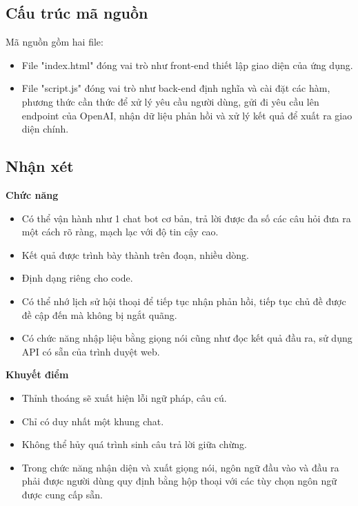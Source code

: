 \documentclass[a4paper, 12pt]{article}
\begin{document}
	
	\subsection{Cấu trúc mã nguồn}
	Mã nguồn gồm hai file: 
	\begin{itemize}
		\item File "index.html" đóng vai trò như front-end thiết lập giao diện của ứng dụng.
		\item File "script.js" đóng vai trò như back-end định nghĩa và cài đặt các hàm, phương thức cần thức để xử lý yêu cầu người dùng, gửi đi yêu cầu lên endpoint của OpenAI, nhận dữ liệu phản hồi và xử lý kết quả để xuất ra giao diện chính.
		
	\end{itemize}
	

	\subsection{Nhận xét}
	\textbf{Chức năng}\\
	\begin{itemize}
		\item Có thể vận hành như 1 chat bot cơ bản, trả lời được đa số các câu hỏi đưa ra một cách rõ ràng, mạch lạc với độ tin cậy cao.
		\item Kết quả được trình bày thành trên đoạn, nhiều dòng.
		\item Định dạng riêng cho code.
		\item Có thể nhớ lịch sử hội thoại để tiếp tục nhận phản hồi, tiếp tục chủ đề được đề cập đến mà không bị ngắt quãng.
		\item Có chức năng nhập liệu bằng giọng nói cũng như đọc kết quả đầu ra, sử dụng API có sẵn của trình duyệt web.
	\end{itemize}
	\vspace{1,5cm}
	\textbf{Khuyết điểm}\\
	\begin{itemize}
		\item Thỉnh thoáng sẽ xuất hiện lỗi ngữ pháp, câu cú.
		\item Chỉ có duy nhất một khung chat.
		\item Không thể hủy quá trình sinh câu trả lời giữa chừng.
		\item Trong chức năng nhận diện và xuất giọng nói, ngôn ngữ đầu vào và đầu ra phải được người dùng quy định bằng hộp thoại với các tùy chọn ngôn ngữ được cung cấp sẵn.
	\end{itemize}
		
\end{document}
